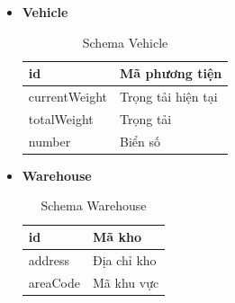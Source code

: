 \begin{itemize}
		\item \textbf{Vehicle}
		
		\begin{table}[!htp]
			\centering\begin{tabular}{|l|m{30em}|}
				\hline 
				id & Mã phương tiện\\
				\hline 
				currentWeight & Trọng tải hiện tại\\
				\hline 
				totalWeight & Trọng tải\\
				\hline 
				number & Biển số\\
				\hline 
			\end{tabular}
			\caption{Schema Vehicle}
		\end{table}
	
	\newpage
	
		\item \textbf{Warehouse}
		
		\begin{table}[!htp]
			\centering\begin{tabular}{|l|m{30em}|}
				\hline 
				id & Mã kho\\
				\hline 
				address & Địa chỉ kho\\
				\hline 
				areaCode & Mã khu vực\\
				\hline 
			\end{tabular}
			\caption{Schema Warehouse}
		\end{table}


	\end{itemize}



	



	